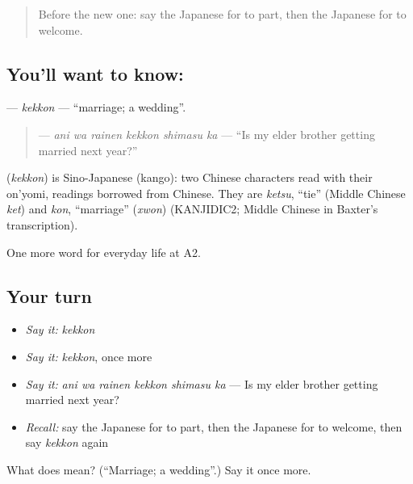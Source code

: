 \label{lesson:JA-C244-kekkon}



\begin{quote}
Before the new one: say the Japanese for to part, then the Japanese for to welcome.
\end{quote}

\subsection*{You'll want to know: }
\textbf{} — \emph{kekkon} — \textquotedblleft{}marriage; a wedding\textquotedblright{}.

\begin{quote}
\textbf{  } — \emph{ani wa rainen kekkon shimasu ka} — \textquotedblleft{}Is my elder brother getting married next year?\textquotedblright{}
\end{quote}

\begin{cousinweb}
\textbf{} (\emph{kekkon}) is Sino-Japanese (kango): two Chinese characters read with their on'yomi, readings borrowed from Chinese. They are \emph{ketsu}, \textquotedblleft{}tie\textquotedblright{} (Middle Chinese \emph{ket}) and \emph{kon}, \textquotedblleft{}marriage\textquotedblright{} (\emph{xwon}) (KANJIDIC2; Middle Chinese in Baxter's transcription).
\end{cousinweb}

\begin{grammarlens}[title={What you've built}]
One more word for everyday life at A2.
\end{grammarlens}

\subsection*{Your turn}
\begin{itemize}
\raggedright
  \item \emph{Say it:} \emph{kekkon}
  \item \emph{Say it:} \emph{kekkon}, once more
  \item \emph{Say it:} \emph{ani wa rainen kekkon shimasu ka} — Is my elder brother getting married next year?
  \item \emph{Recall:} say the Japanese for to part, then the Japanese for to welcome, then say \emph{kekkon} again
\end{itemize}

\begin{tcolorbox}[breakable,colback=teal!4,colframe=teal!35!black,title={Before you move on}]
What does  mean? (\textquotedblleft{}Marriage; a wedding\textquotedblright{}.) Say it once more.
\end{tcolorbox}
